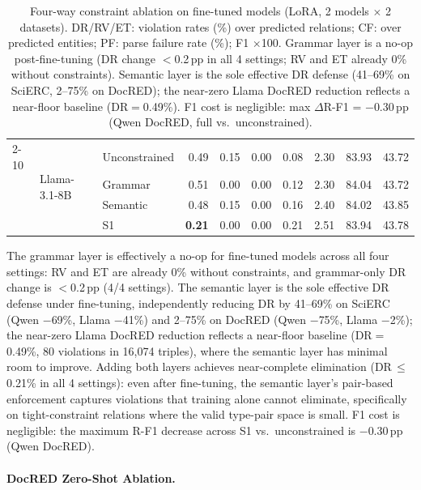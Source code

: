 \begin{table}[t]
{\begin{tabular}{@{}lll rrrrr rr@{}}
  \cmidrule(l){2-10}
  & \multirow{4}{*}{Llama-3.1-8B}
    & Unconstrained & 0.49 & 0.15 & 0.00 & 0.08 & 2.30 & 83.93 & 43.72 \\
  & & Grammar       & 0.51 & 0.00 & 0.00 & 0.12 & 2.30 & 84.04 & 43.72 \\
  & & Semantic      & 0.48 & 0.15 & 0.00 & 0.16 & 2.40 & 84.02 & 43.85 \\
  & & S1       & \textbf{0.21} & 0.00 & 0.00 & 0.21 & 2.51 & 83.94 & 43.78 \\
\bottomrule
\end{tabular}}%
\caption{Four-way constraint ablation on fine-tuned models (LoRA, 2 models $\times$ 2 datasets).
DR/RV/ET: violation rates (\%) over predicted relations; CF: over predicted entities; PF: parse failure rate (\%); F1 $\times$100.
Grammar layer is a no-op post-fine-tuning (DR change $<$0.2\,pp in all 4 settings; RV and ET already 0\% without constraints).
Semantic layer is the sole effective DR defense (41--69\% on SciERC, 2--75\% on DocRED); the near-zero Llama DocRED reduction reflects a near-floor baseline (DR${=}$0.49\%).
F1 cost is negligible: max $\Delta$R-F1 = $-$0.30\,pp (Qwen DocRED, full vs.\ unconstrained).}
\label{tab:ft-ablation}
\end{table}

The grammar layer is effectively a no-op for fine-tuned models across all four settings: RV and ET are already 0\% without constraints, and grammar-only DR change is $<$0.2\,pp (4/4 settings).
The semantic layer is the sole effective DR defense under fine-tuning, independently reducing DR by 41--69\% on SciERC (Qwen $-$69\%, Llama $-$41\%) and 2--75\% on DocRED (Qwen $-$75\%, Llama $-$2\%); the near-zero Llama DocRED reduction reflects a near-floor baseline (DR${=}$0.49\%, 80 violations in 16{,}074 triples), where the semantic layer has minimal room to improve.
Adding both layers achieves near-complete elimination (DR\,$\leq$\,0.21\% in all 4 settings): even after fine-tuning, the semantic layer's pair-based enforcement captures violations that training alone cannot eliminate, specifically on tight-constraint relations where the valid type-pair space is small.
F1 cost is negligible: the maximum R-F1 decrease across S1 vs.\ unconstrained is $-$0.30\,pp (Qwen DocRED).


\paragraph{DocRED Zero-Shot Ablation.}
\label{app:docred-zs-ablation}

